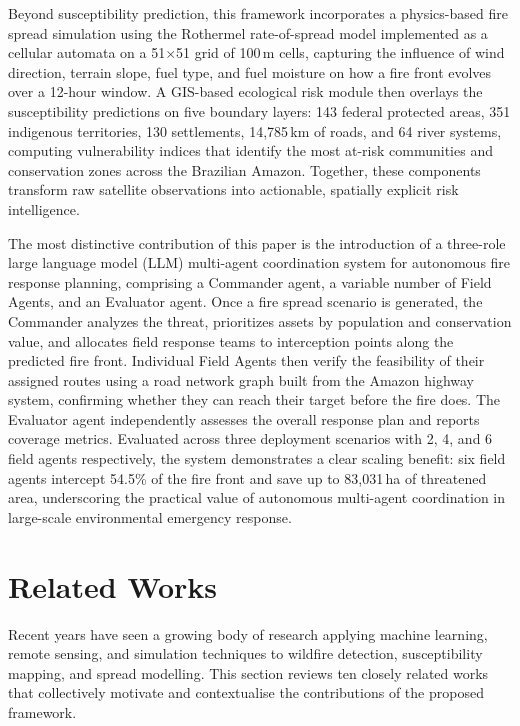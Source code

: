 \documentclass[12pt,a4paper]{article}
\begin{document}
Beyond susceptibility prediction, this framework incorporates a physics-based fire spread simulation using the Rothermel rate-of-spread model implemented as a cellular automata on a 51$\times$51 grid of 100\,m cells, capturing the influence of wind direction, terrain slope, fuel type, and fuel moisture on how a fire front evolves over a 12-hour window. A GIS-based ecological risk module then overlays the susceptibility predictions on five boundary layers: 143 federal protected areas, 351 indigenous territories, 130 settlements, 14,785\,km of roads, and 64 river systems, computing vulnerability indices that identify the most at-risk communities and conservation zones across the Brazilian Amazon. Together, these components transform raw satellite observations into actionable, spatially explicit risk intelligence.

The most distinctive contribution of this paper is the introduction of a three-role large language model (LLM) multi-agent coordination system for autonomous fire response planning, comprising a Commander agent, a variable number of Field Agents, and an Evaluator agent. Once a fire spread scenario is generated, the Commander analyzes the threat, prioritizes assets by population and conservation value, and allocates field response teams to interception points along the predicted fire front. Individual Field Agents then verify the feasibility of their assigned routes using a road network graph built from the Amazon highway system, confirming whether they can reach their target before the fire does. The Evaluator agent independently assesses the overall response plan and reports coverage metrics. Evaluated across three deployment scenarios with 2, 4, and 6 field agents respectively, the system demonstrates a clear scaling benefit: six field agents intercept 54.5\% of the fire front and save up to 83,031\,ha of threatened area, underscoring the practical value of autonomous multi-agent coordination in large-scale environmental emergency response.

\section{Related Works}

Recent years have seen a growing body of research applying machine learning, remote sensing, and simulation techniques to wildfire detection, susceptibility mapping, and spread modelling. This section reviews ten closely related works that collectively motivate and contextualise the contributions of the proposed framework.
\end{document}
